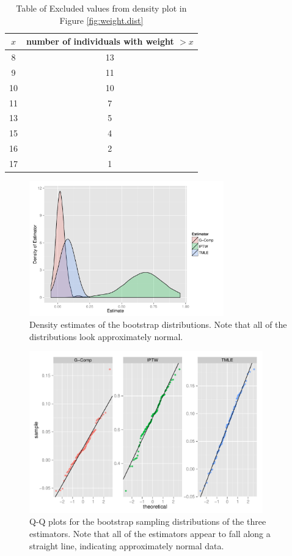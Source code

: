 \documentclass{article}
\begin{document}
\begin{table}
\centering
\begin{tabular}{c|c}
$x$ & number of individuals with weight $>x$ \\
\hline
8 & 13 \\
9 & 11 \\
10 & 10 \\
11 & 7 \\
13 & 5 \\
15 & 4 \\
16 & 2 \\
17 & 1
\end{tabular}
\caption{Table of Excluded values from density plot in Figure \ref{fig:weight.dist}}
\label{tab:missing.weights}
\end{table}

\begin{figure}
\centering
\includegraphics[width=0.75\textwidth]{figures/naiveBootstrapDensities.pdf}
\caption{Density estimates of the bootstrap distributions. Note that all of the distributions look approximately normal.}
\label{fig:boot.distr}
\end{figure}

\begin{figure}[hbp]
\centering
\includegraphics[width=0.9\textwidth]{figures/naiveBootstrapQQplots.pdf}
\caption{Q-Q plots for the bootstrap sampling distributions of the three estimators. Note that all of the estimators appear to fall along a straight line, indicating approximately normal data.}
\label{fig:qqplot}
\end{figure}
\end{document}
